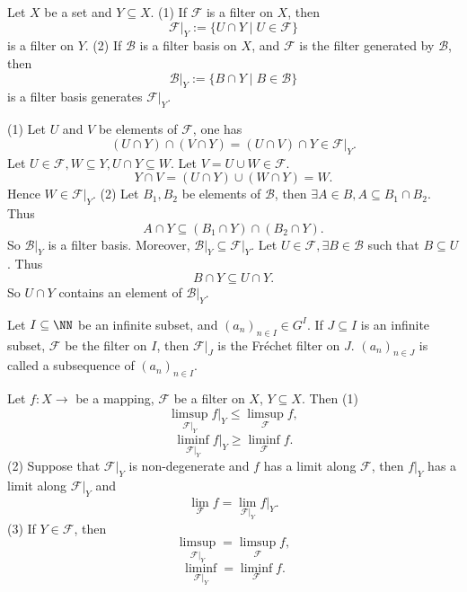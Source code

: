 \begin{propositionenv}
    Let $X$ be a set and $Y\subseteq X$.\newline
    (1) If $\mathcal{F}$ is a filter on $X$, then 
    $$\left.\mathcal{F}\right|_Y:=\{U\cap Y\mid U\in \mathcal{F}\}$$
    is a filter on $Y$.
    \newline
    (2) If $\mathcal{B}$ is a filter basis on $X$, and $\mathcal{F}$ is the filter generated by $\mathcal{B}$, then 
    $$\left.\mathcal{B}\right|_Y:=\{B\cap Y\mid B\in \mathcal{B}\}$$
    is a filter basis generates $\left.\mathcal{F}\right|_Y$.
\end{propositionenv}
\begin{proofenv}
    \quad 
    \newline
    (1) Let $U$ and $V$ be elements of $\mathcal{ F}$, one has 
    $$(U\cap Y)\cap (V\cap Y)=(U\cap V)\cap Y\in \left.\mathcal{F}\right|_Y.$$
    Let $U\in \mathcal{F}, W\subseteq Y,U\cap Y\subseteq W$. Let $V=U\cup W\in \mathcal{F}$.
    $$Y\cap V=(U\cap Y)\cup(W\cap Y)=W.$$
    Hence $W\in \left.\mathcal{F}\right|_Y.$
    \newline
    (2) Let $B_1,B_2$ be elements of $\mathcal{B}$, then $\exists A\in B, A\subseteq B_1\cap B_2.$ Thus 
    $$A\cap Y\subseteq(B_1\cap Y)\cap (B_2\cap Y).$$
    So $\left.\mathcal{ B}\right|_Y$ is a filter basis. Moreover, $\left.\mathcal{B}\right|_Y\subseteq\left.\mathcal{F}\right|_Y$. Let $U\in \mathcal{F}, \exists B\in \mathcal{B}$ such that $B\subseteq U$. Thus 
    $$B\cap Y\subseteq U\cap Y.$$
    So $U\cap Y$  contains an element of $\left.\mathcal{B}\right|_Y$.
\end{proofenv}
\begin{exampleenv}
    Let $I\subseteq \NN$ be an infinite subset, and $(a_n)_{n\in I}\in G^I$. If $J\subseteq I$ is an infinite subset, $\mathcal{F}$ be the filter on $I$, then $\mathcal{F}|_J$ is the Fréchet filter on $J$. $(a_n)_{n\in J}$ is called a subsequence of $(a_n)_{n\in I}$.
\end{exampleenv}
\begin{propositionenv}
    Let $f:X\longrightarrow$  be a mapping, $\mathcal{F}$ be a filter on $X$, $Y\subseteq X$. Then 
    \newline
    (1) 
    $$\limsup_{\mathcal{F}|_Y}f|_Y\le \limsup_{\mathcal{F}}f,$$
    $$\liminf_{\mathcal{F}|_Y}f|_Y\ge \liminf_{\mathcal{F}}f.$$
    (2) Suppose that $\mathcal{F}|_Y$ is non-degenerate and $f$ has a limit along $\mathcal{F}$, then $f|_Y$ has a limit along $\mathcal{F}|_Y$ and 
    $$\lim_{\mathcal{F}}f=\lim_{\mathcal{F}|_Y}f|_Y.$$
    (3) If $Y\in \mathcal{F}$, then 
    $$\limsup_{\mathcal{F}|_Y}=\limsup_{\mathcal{F}}f,$$
    $$\liminf_{\mathcal{F}|_Y}=\liminf_{\mathcal{F}}f.$$
\end{propositionenv}

